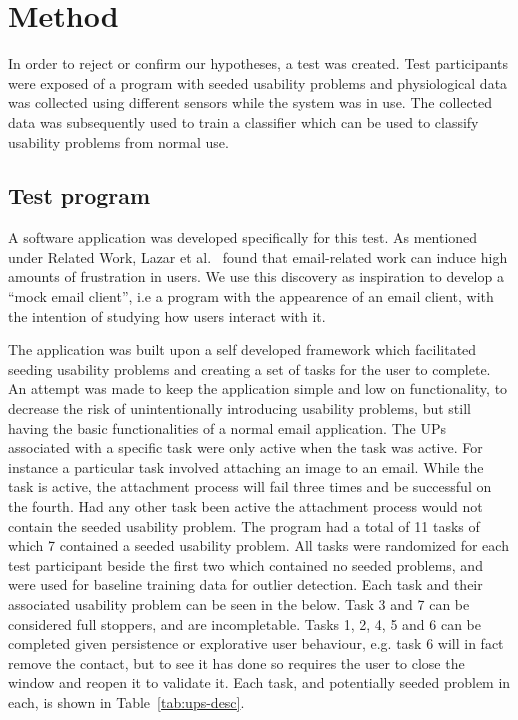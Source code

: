 \section{Method}
In order to reject or confirm our hypotheses, a test was created.
Test participants were exposed of a program with seeded usability problems and physiological data was collected using different sensors while the system was in use. 
The collected data was subsequently used to train a classifier which can be used to classify usability problems from normal use.

\subsection{Test program}
A software application was developed specifically for this test. 
As mentioned under Related Work, Lazar et al.~\cite{frustration_with_computers} found that email-related work can induce
high amounts of frustration in users. We use this discovery as inspiration to develop a ``mock email client'', i.e a program
with the appearence of an email client, with the intention of studying how users interact with it.

The application was built upon a self developed framework which facilitated seeding usability problems and creating a set of tasks for the user to complete. 
An attempt was made to keep the application simple and low on functionality, to decrease the risk of unintentionally introducing usability problems, but still having the basic functionalities of a normal email application.  
The UPs associated with a specific task were only active when the task was active. 
For instance a particular task involved attaching an image to an email. 
While the task is active, the attachment process will fail three times and be successful on the fourth. 
Had any other task been active the attachment process would not contain the seeded usability problem.
The program had a total of 11 tasks of which 7 contained a seeded usability problem. 
All tasks were randomized for each test participant beside the first two which contained no seeded problems, and were used for baseline training data for outlier detection. 
Each task and their associated usability problem can be seen in the below. 
Task 3 and 7 can be considered full stoppers, and are incompletable. 
Tasks 1, 2, 4, 5 and 6 can be completed given persistence or explorative user behaviour, e.g. task 6 will in fact remove the contact, but to see it has done so requires the user to close the window and reopen it to validate it.
Each task, and potentially seeded problem in each, is shown in Table~\ref{tab:ups-desc}.

